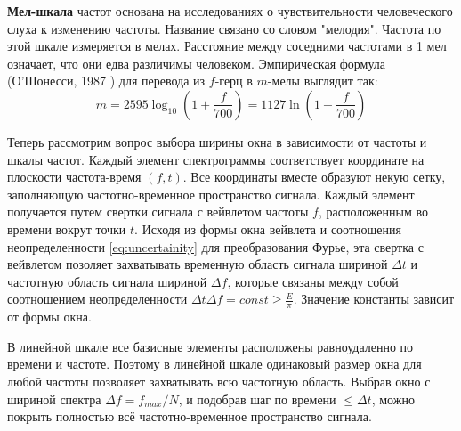 \textbf{Мел-шкала} \cite{MelScale} частот основана на исследованиях о чувствительности человеческого слуха к изменению частоты. Название связано со словом "мелодия".
Частота по этой шкале измеряется в мелах. Расстояние между соседними частотами в 1 мел означает, что они едва различимы человеком.
Эмпирическая формула (О'Шонесси, 1987 \cite{oshaughnessy1987speech}) для перевода из $f$-герц в $m$-мелы выглядит так:
\begin{equation}
  m = 2595 \log_{10}(1 + \frac{f}{700}) = 1127 \ln(1 + \frac{f}{700})
\end{equation}


Теперь рассмотрим вопрос выбора ширины окна в зависимости от частоты и шкалы частот. 
Каждый элемент спектрограммы соответствует координате на плоскости частота-время $(f, t)$. Все координаты вместе образуют некую сетку, 
заполняющую частотно-временное пространство сигнала. 
Каждый элемент получается путем свертки сигнала с вейвлетом частоты $f$, расположенным во времени вокрут точки $t$.  
Исходя из формы окна вейвлета и соотношения неопределенности \ref{eq:uncertainity} для преобразования Фурье, 
эта свертка с вейвлетом позоляет захватывать временную область сигнала шириной $\Delta t$ и частотную область сигнала шириной $\Delta f$, 
которые связаны между собой соотношением неопределенности $\Delta t \Delta f = const \geq {\frac {E}{\pi }}$. Значение константы зависит от формы окна.

В линейной шкале все базисные элементы расположены равноудаленно по времени и частоте. 
Поэтому в линейной шкале одинаковый размер окна для любой частоты позволяет захватывать всю частотную область.
Выбрав окно с шириной спектра $\Delta f = f_{max} / N$, и подобрав шаг
по времени $\leq \Delta t$, можно покрыть полностью всё частотно-временное пространство сигнала.

